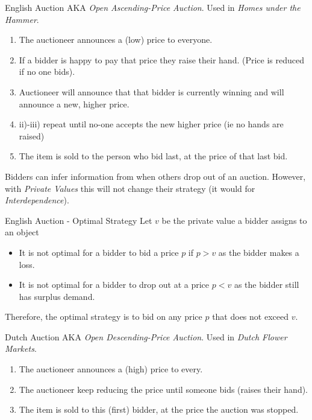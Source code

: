 \documentclass[11pt,a4paper]{article}
\begin{document}
\begin{definition}{English Auction}
  AKA \textit{Open Ascending-Price Auction}. Used in \textit{Homes under the Hammer}.
  \begin{enumerate}
    \item The auctioneer announces a (low) price to everyone.
    \item If a bidder is happy to pay that price they raise their hand. (Price is reduced if no one bids).
    \item Auctioneer will announce that that bidder is currently winning and will announce a new, higher price.
    \item ii)-iii) repeat until no-one accepts the new higher price (ie no hands are raised)
    \item The item is sold to the person who bid last, at the price of that last bid.
  \end{enumerate}
  Bidders can infer information from when others drop out of an auction. However, with \textit{Private Values} this will not change their strategy (it would for \textit{Interdependence}).
\end{definition}

\begin{proposition}{English Auction - Optimal Strategy}
  Let $v$ be the private value a bidder assigns to an object
  \begin{itemize}
    \item It is not optimal for a bidder to bid a price $p$ if $p>v$ as the bidder makes a loss.
    \item It is not optimal for a bidder to drop out at a price $p<v$ as the bidder still has surplus demand.
  \end{itemize}
  Therefore, the optimal strategy is to bid on any price $p$ that does not exceed $v$.
\end{proposition}

\begin{definition}{Dutch Auction}
  AKA \textit{Open Descending-Price Auction}. Used in \textit{Dutch Flower Markets}.
  \begin{enumerate}
    \item The auctioneer announces a (high) price to every.
    \item The auctioneer keep reducing the price until someone bids (raises their hand).
    \item The item is sold to this (first) bidder, at the price the auction was stopped.
  \end{enumerate}
\end{definition}
\end{document}
